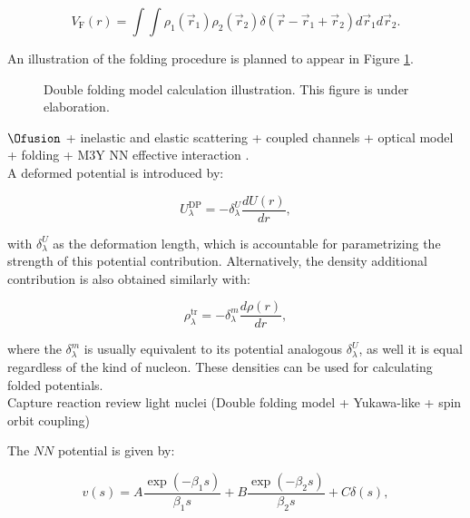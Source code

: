 \documentclass[openany]{book}
\begin{document}
\begin{equation} \label{eq:potential_SaoPaulo_folding}
	V_{\mathrm{F}}(r) = \int \int \rho_1(\vec r_1)  \rho_2(\vec r_2) \delta(\vec r - \vec r_1 +  \vec r_2) {d\vec{r}_1}  {d\vec{r}_2}.
\end{equation}

An illustration of the folding procedure is planned to appear in Figure \ref{fig:DoubleFolding}.

\begin{figure}[H]
	
	\caption[Double folding model calculation illustration]{Double folding model calculation illustration. This figure is under elaboration.}
	\label{fig:DoubleFolding}
\end{figure}

$\Ofusion$ + inelastic and elastic scattering + coupled channels + optical model + folding + M3Y NN effective interaction \cite{hassanain_al_sebiey_2014}.  \\

A deformed potential is introduced by: 

\begin{equation}\label{eq:potential_deformed}
	U^{\mathrm{DP}}_\lambda = - \delta^{U}_\lambda \frac{dU(r)}{dr},
\end{equation} 

with $\delta^{U}_\lambda$ as the deformation length, which is accountable for parametrizing the strength of this potential contribution. Alternatively, the density additional contribution is also obtained similarly with: 

\begin{equation}\label{eq:potential_deformed_density}
	\rho^{\mathrm{tr}}_\lambda = - \delta^{m}_\lambda \frac{d\rho(r)}{dr},
\end{equation} 

where the $\delta^{m}_\lambda$ is usually equivalent to its potential analogous $\delta^{U}_\lambda$, as well it is equal regardless of the kind of nucleon. These densities can be used for calculating folded potentials. \\

Capture reaction review light nuclei (Double folding model + Yukawa-like + spin orbit coupling)\cite{ghasemi_sadeghi_2018}


The $NN$ potential is given by:

\begin{equation}\label{eq:potential_NN_YukawaDelta}
	v(s) = A \frac{\exp {(-\beta_1 s)}}{\beta_1 s} + B \frac{\exp {(-\beta_2 s)}}{\beta_2 s} + C \delta(s),
\end{equation}
\end{document}
